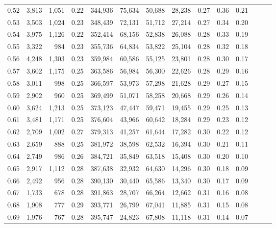\begin{tabular}{rrrrrrrrrrrrrr}
0.52 &   3,813 &  1,051 &  0.22 &  344,936 &   75,634 &  50,688 &  28,238 &  0.27 &  0.36 &      0.21 \\
0.53 &   3,503 &  1,024 &  0.23 &  348,439 &   72,131 &  51,712 &  27,214 &  0.27 &  0.34 &      0.20 \\
0.54 &   3,975 &  1,126 &  0.22 &  352,414 &   68,156 &  52,838 &  26,088 &  0.28 &  0.33 &      0.19 \\
0.55 &   3,322 &    984 &  0.23 &  355,736 &   64,834 &  53,822 &  25,104 &  0.28 &  0.32 &      0.18 \\
0.56 &   4,248 &  1,303 &  0.23 &  359,984 &   60,586 &  55,125 &  23,801 &  0.28 &  0.30 &      0.17 \\
0.57 &   3,602 &  1,175 &  0.25 &  363,586 &   56,984 &  56,300 &  22,626 &  0.28 &  0.29 &      0.16 \\
0.58 &   3,011 &    998 &  0.25 &  366,597 &   53,973 &  57,298 &  21,628 &  0.29 &  0.27 &      0.15 \\
0.59 &   2,902 &    960 &  0.25 &  369,499 &   51,071 &  58,258 &  20,668 &  0.29 &  0.26 &      0.14 \\
0.60 &   3,624 &  1,213 &  0.25 &  373,123 &   47,447 &  59,471 &  19,455 &  0.29 &  0.25 &      0.13 \\
0.61 &   3,481 &  1,171 &  0.25 &  376,604 &   43,966 &  60,642 &  18,284 &  0.29 &  0.23 &      0.12 \\
0.62 &   2,709 &  1,002 &  0.27 &  379,313 &   41,257 &  61,644 &  17,282 &  0.30 &  0.22 &      0.12 \\
0.63 &   2,659 &    888 &  0.25 &  381,972 &   38,598 &  62,532 &  16,394 &  0.30 &  0.21 &      0.11 \\
0.64 &   2,749 &    986 &  0.26 &  384,721 &   35,849 &  63,518 &  15,408 &  0.30 &  0.20 &      0.10 \\
0.65 &   2,917 &  1,112 &  0.28 &  387,638 &   32,932 &  64,630 &  14,296 &  0.30 &  0.18 &      0.09 \\
0.66 &   2,492 &    956 &  0.28 &  390,130 &   30,440 &  65,586 &  13,340 &  0.30 &  0.17 &      0.09 \\
0.67 &   1,733 &    678 &  0.28 &  391,863 &   28,707 &  66,264 &  12,662 &  0.31 &  0.16 &      0.08 \\
0.68 &   1,908 &    777 &  0.29 &  393,771 &   26,799 &  67,041 &  11,885 &  0.31 &  0.15 &      0.08 \\
0.69 &   1,976 &    767 &  0.28 &  395,747 &   24,823 &  67,808 &  11,118 &  0.31 &  0.14 &      0.07 \\

\end{tabular}
